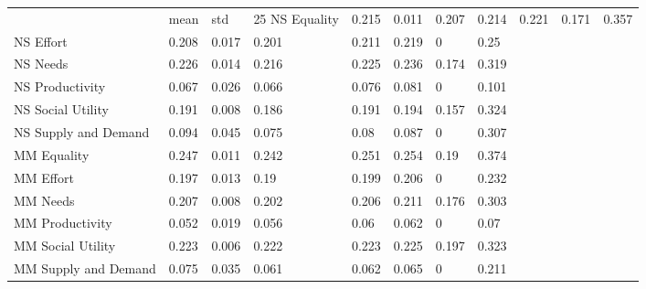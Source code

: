 \begin{tabular}{llllllll}
\toprule
 & mean & std & 25%
\midrule
NS Equality & 0.215 & 0.011 & 0.207 & 0.214 & 0.221 & 0.171 & 0.357 \\
NS Effort & 0.208 & 0.017 & 0.201 & 0.211 & 0.219 & 0 & 0.25 \\
NS Needs & 0.226 & 0.014 & 0.216 & 0.225 & 0.236 & 0.174 & 0.319 \\
NS Productivity & 0.067 & 0.026 & 0.066 & 0.076 & 0.081 & 0 & 0.101 \\
NS Social Utility & 0.191 & 0.008 & 0.186 & 0.191 & 0.194 & 0.157 & 0.324 \\
NS Supply and Demand & 0.094 & 0.045 & 0.075 & 0.08 & 0.087 & 0 & 0.307 \\
MM Equality & 0.247 & 0.011 & 0.242 & 0.251 & 0.254 & 0.19 & 0.374 \\
MM Effort & 0.197 & 0.013 & 0.19 & 0.199 & 0.206 & 0 & 0.232 \\
MM Needs & 0.207 & 0.008 & 0.202 & 0.206 & 0.211 & 0.176 & 0.303 \\
MM Productivity & 0.052 & 0.019 & 0.056 & 0.06 & 0.062 & 0 & 0.07 \\
MM Social Utility & 0.223 & 0.006 & 0.222 & 0.223 & 0.225 & 0.197 & 0.323 \\
MM Supply and Demand & 0.075 & 0.035 & 0.061 & 0.062 & 0.065 & 0 & 0.211 \\
\bottomrule
\end{tabular}
